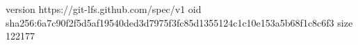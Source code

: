 version https://git-lfs.github.com/spec/v1
oid sha256:6a7c90f2f5d5af19540ded3d7975f3fc85d1355124c1c10e153a5b68f1c8c6f3
size 122177
